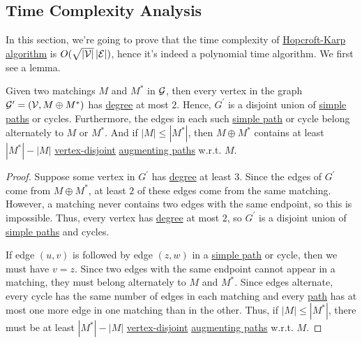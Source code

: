 \subsection{Time Complexity Analysis}
In this section, we're going to prove that the time complexity of \hyperref[algo:Hopcroft-Karp-algorithm]{Hopcroft-Karp algorithm}
is \(O(\sqrt{\left\vert \mathcal{\MakeUppercase{V}}  \right\vert } \left\vert \mathcal{\MakeUppercase{e}}  \right\vert )\), hence it's
indeed a polynomial time algorithm. We first see a lemma.

\begin{lemma}\label{lma:lec25-2}
	Given two matchings \(M\) and \(M^{\ast} \) in \(\mathcal{\MakeUppercase{g}} \), then every vertex in the graph
	\(\mathcal{\MakeUppercase{g}} ^\prime =(\mathcal{\MakeUppercase{v}} , M\oplus M^{\ast} )\) has \hyperref[def:degree]{degree} at most \(2\). Hence,
	\(G^\prime \) is a disjoint union of \hyperref[def:simple-path]{simple paths} or cycles. Furthermore, the edges in each such \hyperref[def:simple-path]{simple path}
	or cycle belong alternately to \(M\) or \(M^{\ast} \). And if \(\left\vert M \right\vert \leq \left\vert M^{\ast}  \right\vert \), then
	\(M\oplus M^{\ast} \) contains at least \(\left\vert M^{\ast}  \right\vert - \left\vert M \right\vert \) \hyperref[def:vertex-independent]{vertex-disjoint}
	\hyperref[def:augmenting-path]{augmenting paths} w.r.t. \(M\).
\end{lemma}
\begin{proof}
	Suppose some vertex in \(G^\prime \) has \hyperref[def:degree]{degree} at least \(3\). Since the edges of \(G^\prime \) come from \(M\oplus M^{\ast} \),
	at least \(2\) of these edges come from the same matching. However, a matching never contains two edges with the same endpoint, so this is impossible.
	Thus, every vertex has \hyperref[def:degree]{degree} at most \(2\), so \(G^\prime \) is a disjoint union of \hyperref[def:simple-path]{simple paths} and cycles.

	If edge \((u, v)\) is followed by edge \((z, w)\) in a \hyperref[def:simple-path]{simple path} or cycle, then we must have \(v=z\). Since two edges with
	the same endpoint cannot appear in a matching, they must belong alternately to \(M\) and \(M^{\ast} \). Since edges alternate, every cycle has
	the same number of edges in each matching and every \hyperref[def:path]{path} has at most one more edge in one matching than in the other. Thus, if
	\(\left\vert M \right\vert \leq \left\vert M^{\ast}  \right\vert \), there must be at least \(\left\vert M^{\ast} \right\vert - \left\vert M \right\vert \)
	\hyperref[def:vertex-independent]{vertex-disjoint} \hyperref[def:augmenting-path]{augmenting paths} w.r.t. \(M\).
\end{proof}

